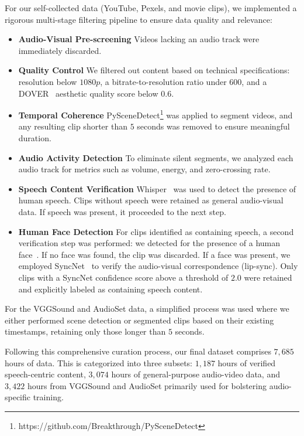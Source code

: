 For our self-collected data (YouTube, Pexels, and movie clips), we implemented a rigorous multi-stage filtering pipeline to ensure data quality and relevance:
\begin{itemize}[leftmargin=*]
    \item \textbf{Audio-Visual Pre-screening} Videos lacking an audio track were immediately discarded.
    \item \textbf{Quality Control} We filtered out content based on technical specifications: resolution below $1080p$, a bitrate-to-resolution ratio under $600$, and a DOVER~\cite{wu2023exploring} aesthetic quality score below $0.6$.
    \item \textbf{Temporal Coherence} PySceneDetect\footnote{https://github.com/Breakthrough/PySceneDetect} was applied to segment videos, and any resulting clip shorter than $5$ seconds was removed to ensure meaningful duration.
    \item \textbf{Audio Activity Detection} To eliminate silent segments, we analyzed each audio track for metrics such as volume, energy, and zero-crossing rate.
    \item \textbf{Speech Content Verification} Whisper~\cite{radford2023robust} was used to detect the presence of human speech. Clips without speech were retained as general audio-visual data. If speech was present, it proceeded to the next step.
    \item \textbf{Human Face Detection} For clips identified as containing speech, a second verification step was performed: we detected for the presence of a human face~\cite{deng2020retinaface}. If no face was found, the clip was discarded. If a face was present, we employed SyncNet~\cite{chung2016out} to verify the audio-visual correspondence (lip-sync). Only clips with a SyncNet confidence score above a threshold of $2.0$ were retained and explicitly labeled as containing speech content.
\end{itemize}


For the VGGSound and AudioSet data, a simplified process was used where we either performed scene detection or segmented clips based on their existing timestamps, retaining only those longer than $5$ seconds.

Following this comprehensive curation process, our final dataset comprises $7,685$ hours of data. This is categorized into three subsets: $1,187$ hours of verified speech-centric content, $3,074$ hours of general-purpose audio-video data, and $3,422$ hours from VGGSound and AudioSet primarily used for bolstering audio-specific training.

